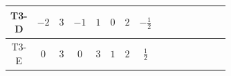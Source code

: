 \documentclass[8pt]{article}
\begin{document}
\begin{landscape}
\begin{longtable}{@{}cccccccc >{\raggedright\arraybackslash}p{0.21\linewidth} >{\raggedright\arraybackslash}p{0.21\linewidth} >{\raggedright\arraybackslash}p{0.21\linewidth}@{}}
\midrule
T3-D & $-2$ & $3$ & $-1$ & $1$ & $0$ & $2$ & $-\frac{1}{2}$ & \scriptsize\adjustbox{max width=\linewidth}{$\begin{gathered} +D_{\mu _1}\left(S_2\right){}^{\dagger } D_{\mu _1}\left(S_2\right)\end{gathered}$} & \scriptsize\adjustbox{max width=\linewidth}{$\begin{gathered} -\overline{F_{j_1,r_1}}\, F_{j_1,r_1} M_F\end{gathered}$} & \scriptsize\adjustbox{max width=\linewidth}{$\begin{gathered} +i \overline{F_{j_1,r_1}}\, \gamma ^{\mu _1}\, D_{\mu _1}\left(F_{j_1,r_1}\right)\end{gathered}$} \\
\midrule
T3-E & $0$ & $3$ & $0$ & $3$ & $1$ & $2$ & $\frac{1}{2}$ & \scriptsize\adjustbox{max width=\linewidth}{$\begin{gathered} +D_{\mu _1}\left(S_{2,j_1}\right){}^{\dagger } D_{\mu _1}\left(S_{2,j_1}\right)\end{gathered}$} & \scriptsize\adjustbox{max width=\linewidth}{$\begin{gathered} -\overline{F_{j_1,r_1}}\, F_{j_1,r_1} M_F\end{gathered}$} & \scriptsize\adjustbox{max width=\linewidth}{$\begin{gathered} +i \overline{F_{j_1,r_1}}\, \gamma ^{\mu _1}\, D_{\mu _1}\left(F_{j_1,r_1}\right)\end{gathered}$} \\
\midrule
\bottomrule
\end{longtable}
\clearpage

\end{landscape}
\end{document}
